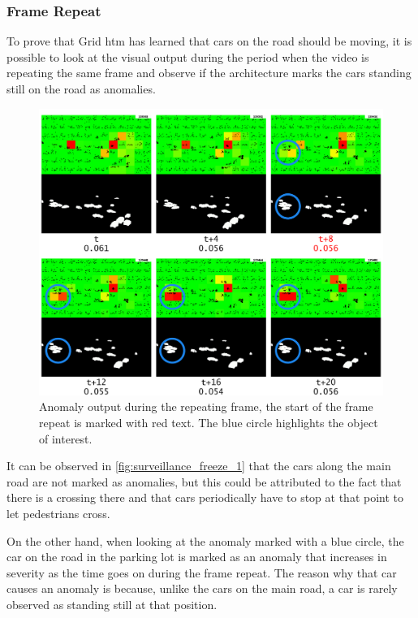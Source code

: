 \subsubsection{Frame Repeat}
To prove that Grid \gls*{htm} has learned that cars on the road should be moving, it is possible to look at the visual output during the period when the video is repeating the same frame and observe if the architecture marks the cars standing still on the road as anomalies.
\begin{figure}[H]
    \centering
    \includegraphics[width=\textwidth]{resources/experiments/surveillance/surveillance_freeze_1.png}
    \caption[Frame Repeat Anomaly]{Anomaly output during the repeating frame, the start of the frame repeat is marked with red text. The blue circle highlights the object of interest.}
    \label{fig:surveillance_freeze_1}
\end{figure}
It can be observed in \autoref{fig:surveillance_freeze_1} that the cars along the main road are not marked as anomalies, but this could be attributed to the fact that there is a crossing there and that cars periodically have to stop at that point to let pedestrians cross.
\par
On the other hand, when looking at the anomaly marked with a blue circle, the car on the road in the parking lot is marked as an anomaly that increases in severity as the time goes on during the frame repeat. The reason why that car causes an anomaly is because, unlike the cars on the main road, a car is rarely observed as standing still at that position.
